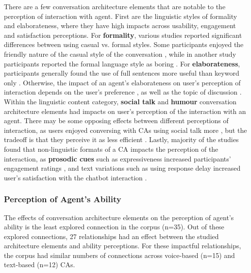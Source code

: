 \documentclass[sigconf,screen,review, anonymous]{acmart}
\newcommand{\cmt}[1]{}%
\begin{document}
There are a few conversation architecture elements that are notable to the perception of interaction with agent. First are the linguistic styles of formality and elaborateness, where they have high impacts across usability, engagement and satisfaction perceptions. For \textbf{formality}, various studies reported significant differences between using casual vs. formal styles. Some participants enjoyed the friendly nature of the casual style of the conversation \cite{cox2022does}\cmt{[27]}, while in another study participants reported the formal language style as boring \cite{kim2019comparing}\cmt{[89]}. For \textbf{elaborateness}, participants generally found the use of full sentences more useful than keyword only \cite{haas2022keep}\cmt{[78]}\cite{roy2021users}\cmt{[71]}. Otherwise, the impact of an agent's elaborateness on user's perception of interaction depends on the user's preference \cite{miehle2018exploring}\cmt{[51]}, as well as the topic of discussion \cite{haas2022keep}\cmt{[78]}. Within the linguistic content category, \textbf{social talk} and \textbf{humour} conversation architecture elements had impacts on user's perception of the interaction with an agent. There may be some opposing effects between different perceptions of interaction, as users enjoyed conversing with CAs using social talk more \cite{lee2020hear}\cmt{[23]}\cite{roy2021users}\cmt{[71]}, but the tradeoff is that they perceive it as less efficient \cite{roy2021users}\cmt{[71]}. Lastly, majority of the studies found that non-linguistic formats of a CA impacts the perception of the interaction, as \textbf{prosodic cues} such as expressiveness increased participants' engagement ratings \cite{zhu2022effects}\cmt{[26]}, and text variations such as using response delay increased user's satisfaction with the chatbot interaction \cite{gnewuch2018faster}\cmt{[19]}.

\subsubsection{Perception of Agent's Ability}

The effects of conversation architecture elements on the perception of agent's ability is the least explored connection in the corpus (n=35). Out of these explored connections, 27 relationships had an effect between the studied architecture elements and ability perceptions. For these impactful relationships, the corpus had similar numbers of connections across voice-based (n=15) and text-based (n=12) CAs.
\end{document}
